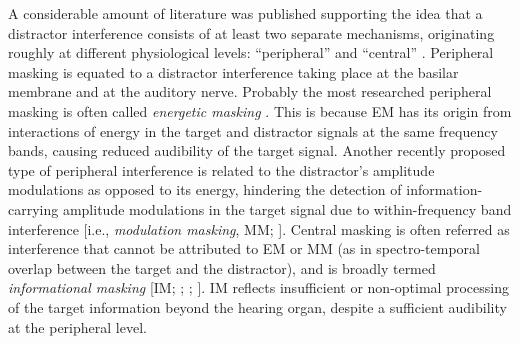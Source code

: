 \documentclass[a4paper, twoside]{templates/ociamthesis}
\begin{document}
A considerable amount of literature was published supporting the idea that a distractor interference consists of at least two separate mechanisms, originating roughly at different physiological levels: ``peripheral'' and ``central'' \autocite[for an overview see][]{Moore2012}.
Peripheral masking is equated to a distractor interference taking place at the basilar membrane and at the auditory nerve. Probably the most researched peripheral masking is often called \textit{energetic masking} \autocites[EM; see][]{Moore2012,Rosen2013}. This is because EM has its origin from interactions of energy in the target and distractor signals at the same frequency bands, causing reduced audibility of the target signal.
Another recently proposed type of peripheral interference is related to the distractor's amplitude modulations as opposed to its energy, hindering the detection of information-carrying amplitude modulations in the target signal due to within-frequency band interference {[}i.e., \textit{modulation masking}, MM; \textcite{Stone2012}{]}.
Central masking is often referred as interference that cannot be attributed to EM or MM (as in spectro-temporal overlap between the target and the distractor), and is broadly termed \textit{informational masking} {[}IM; \textcite{Kidd2002}; \textcite{Durlach2003}; \textcite{Moore2012}{]}. IM reflects insufficient or non-optimal processing of the target information beyond the hearing organ, despite a sufficient audibility at the peripheral level.\\
\end{document}

